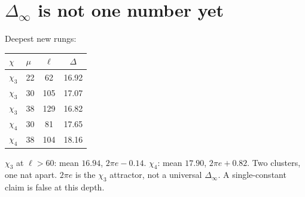 \documentclass[10pt]{article}
\begin{document}
\section*{$\Delta_\infty$ is not one number yet}
Deepest new rungs:
\begin{center}\small
\begin{tabular}{llcc}
\toprule
$\chi$ & $\mu$ & $\ell$ & $\Delta$ \\
\midrule
$\chi_3$ & 22 & 62 & 16.92 \\
$\chi_3$ & 30 & 105 & 17.07 \\
$\chi_3$ & 38 & 129 & 16.82 \\
$\chi_4$ & 30 & 81 & 17.65 \\
$\chi_4$ & 38 & 104 & 18.16 \\
\bottomrule
\end{tabular}
\end{center}
$\chi_3$ at $\ell>60$: mean $16.94$, $2\pi e-0.14$.
$\chi_4$: mean $17.90$, $2\pi e+0.82$.
Two clusters, one nat apart. $2\pi e$ is the $\chi_3$ attractor, not
a universal $\Delta_\infty$. A single-constant claim is false at
this depth.
\end{document}
